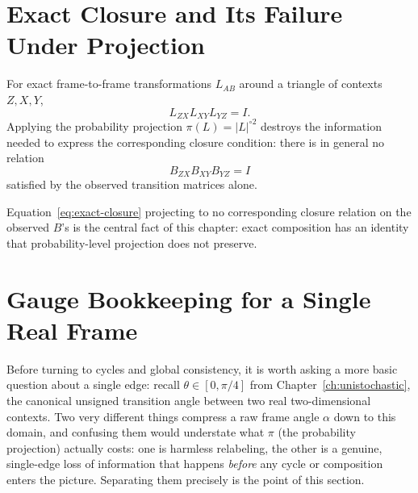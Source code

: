 \section{Exact Closure and Its Failure Under Projection}

For exact frame-to-frame transformations $L_{AB}$ around a triangle of contexts
$Z, X, Y$,
\begin{equation}
L_{ZX} L_{XY} L_{YZ} = I.
\label{eq:exact-closure}
\end{equation}
Applying the probability projection $\pi(L) = |L|^{\circ 2}$ destroys the
information needed to express the corresponding closure condition: there is in
general no relation
\begin{equation}
B_{ZX} B_{XY} B_{YZ} = I
\end{equation}
satisfied by the observed transition matrices alone.

\begin{ledgerentry}
Equation~\eqref{eq:exact-closure} projecting to no corresponding closure relation
on the observed $B$'s is the central fact of this chapter: exact composition has
an identity that probability-level projection does not preserve.
\end{ledgerentry}

\section{Gauge Bookkeeping for a Single Real Frame}
\label{sec:gauge-single-frame}

Before turning to cycles and global consistency, it is worth asking a more
basic question about a single edge: recall $\theta \in [0,\pi/4]$ from
Chapter~\ref{ch:unistochastic}, the canonical unsigned transition angle
between two real two-dimensional contexts. Two very different things
compress a raw frame angle $\alpha$ down to this domain, and confusing them
would understate what $\pi$ (the probability projection) actually costs: one
is harmless relabeling, the other is a genuine, single-edge loss of
information that happens \emph{before} any cycle or composition enters the
picture. Separating them precisely is the point of this section.

